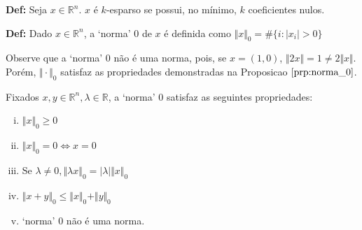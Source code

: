 \textbf{Def:} Seja $x \in \mathbb{R}^n$. $x$ é $k$-esparso se possui, no mínimo, $k$ coeficientes nulos.

\textbf{Def:} Dado $x \in \mathbb{R}^n$, a `norma' $0$ de $x$ é definida como
$\Vert x \Vert_{0} = \# \lbrace i : \vert x_i \vert > 0 \rbrace$ 

Observe que a `norma' 0 não é uma norma, pois, se $x = (1, 0)$, $\Vert 2x \Vert = 1 \neq 2 \Vert x \Vert$. Porém, $\Vert \cdot \Vert_0$ satisfaz as propriedades demonstradas na Proposicao $\ref{prp:norma_0}$.

\begin{proposicao}
Fixados $x, y \in \mathbb{R}^n, \lambda \in \mathbb{R}$, a `norma' $0$ satisfaz as seguintes propriedades:
\begin{enumerate}[(i)]
\item $\Vert x \Vert_0 \geq 0$
\item $\Vert x \Vert_0 = 0 \Leftrightarrow x = 0$
\item Se $\lambda \neq 0, \Vert \lambda x \Vert_0 = \vert \lambda \vert \Vert x \Vert_0$
\item $\Vert x + y \Vert_0 \leq \Vert x \Vert_0 + \Vert y \Vert_0$
\item `norma' $0$ não é uma norma.
\end{enumerate}
\label{prp:norma_0}
\end{proposicao}
